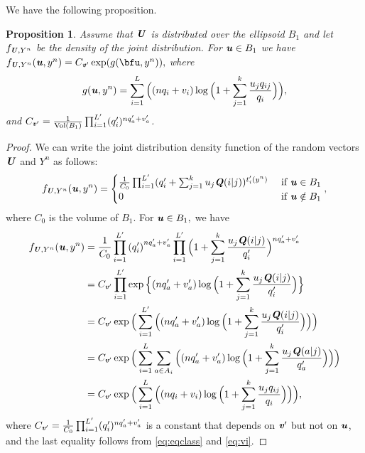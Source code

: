 \documentclass[11pt,onecolumn]{IEEEtran}
\newtheorem{proposition}[theorem]{Proposition}
\def\mathbi#1{{\textbf{\textit #1}}}
\begin{document}
\vspace*{.1in}
We have the following proposition.
\begin{proposition}\label{prop:fg} Assume that $\mathbi{U}$ is distributed over the ellipsoid $B_1$ and let $f_{\mathbi{U},Y^n}$ be
the density of the joint distribution.
For $\mathbi{u}\in B_1$ we have $f_{\mathbi{U},Y^n}(\mathbi{u},y^n)=C_{\mathbi{v}'}\exp(g(\bfu,y^n)),$
where
   \begin{equation}\label{eq:defg}
g(\mathbi{u},y^n) = \sum_{i=1}^L  \Big( (n q_i + v_i)
\log \Big( 1 + \sum_{j=1}^k \frac{u_j q_{ij}}{q_i} \Big) \Big),
\end{equation}
and $C_{\mathbi{v}'}=\frac{1}{\text{\rm Vol}(B_1)} \prod_{i=1}^{L'} (q'_i)^{n q'_a + v'_a}$.
\end{proposition}
\begin{proof}
We can write the joint distribution density function of the random vectors $\mathbi{U}$ and $Y^n$ as follows:
$$
f_{\mathbi{U},Y^n}(\mathbi{u},y^n)=  \begin{cases}
\frac{1}{C_0} \prod_{i=1}^{L'} (q'_i + \sum_{j=1}^k u_j \mathbi{Q}(i|j))^{t_i'(y^n)} & \mbox{~if~} \mathbi{u}\in B_1 \\
0 & \mbox{~if~}  \mathbi{u}\notin B_1
\end{cases},
$$
where $C_0$ is the volume of $B_1.$ For $\mathbi{u}\in B_1,$ we have
\begin{align*}
f_{\mathbi{U},Y^n}(\mathbi{u},y^n)
& =  \frac{1}{C_0} \prod_{i=1}^{L'} {(q'_i)}^{n q'_a + v'_a} 
\prod_{i=1}^{L'}  \Big(1 + \sum_{j=1}^k \frac{u_j \mathbi{Q}(i|j)}{q'_i}\Big)^{n q'_a + v'_a} \\
& = C_{\mathbi{v}'} \prod_{i=1}^{L'} \exp\Big\{  (n q'_a + v'_a)
\log \Big( 1 + \sum_{j=1}^k \frac{u_j \mathbi{Q}(i|j)}{q'_i} \Big) \Big\} \\
& = C_{\mathbi{v}'}  \exp\Big( \sum_{i=1}^{L'} \Big( (n q'_a + v'_a)
\log \Big( 1 + \sum_{j=1}^k \frac{u_j \mathbi{Q}(i|j)}{q'_i} \Big) \Big) \Big) \\
& = C_{\mathbi{v}'}  \exp\Big( \sum_{i=1}^L \sum_{a \in A_i} \Big( (n q'_a + v'_a)
\log \Big( 1 + \sum_{j=1}^k \frac{u_j \mathbi{Q}(a|j)}{q'_a} \Big) \Big) \Big) \\
& = C_{\mathbi{v}'}  \exp\Big( \sum_{i=1}^L \Big(  (n q_i + v_i)
\log \Big( 1 + \sum_{j=1}^k \frac{u_j q_{ij}}{q_i}  \Big) \Big) \Big),
\end{align*}
where $C_{\mathbi{v}'}=\frac{1}{C_0} \prod_{i=1}^{L'} (q'_i)^{n q'_a + v'_a}$ is a constant
that depends on $\mathbi{v}'$ but not on $\mathbi{u}$, and 
the last equality follows from \eqref{eq:eqclass} and \eqref{eq:vi}. 
\end{proof}
\end{document}

